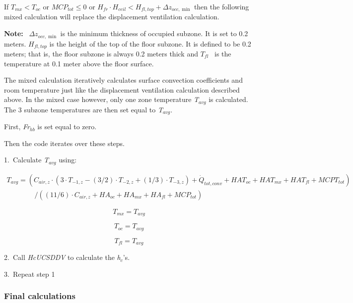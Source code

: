 If \({T_{mx}} < {T_{oc}}\) or \(MC{P_{tot}} \le 0\) or \({H_{fr}} \cdot {H_{ceil}} < {H_{fl,top}} + \Delta {z_{occ,\min }}\) then the following mixed calculation will replace the displacement ventilation calculation.

\textbf{Note:} ~\(\Delta {z_{occ,\min }}\) is the minimum thickness of occupied subzone. It is set to 0.2 meters. \({H_{fl,top}}\) is the height of the top of the floor subzone. It is defined to be 0.2 meters; that is, the floor subzone is always 0.2 meters thick and \({T_{fl}}\) ~is the temperature at 0.1 meter above the floor surface.

The mixed calculation iteratively calculates surface convection coefficients and room temperature just like the displacement ventilation calculation described above. In the mixed case however, only one zone temperature \emph{T\(_{avg}\)} is calculated. The 3 subzone temperatures are then set equal to \emph{T\(_{avg}\)}.

First, \emph{Fr\(_{hb}\)} is set equal to zero.

Then the code iterates over these steps.

1.~Calculate \emph{T\(_{avg}\)} using:

{\scriptsize
\begin{equation}
\begin{array}{l}
T_{avg} = (C_{air,z} \cdot (3 \cdot T_{ - 1,z} - (3/2) \cdot T_{ - 2,z} + (1/3) \cdot T_{ - 3,z}) + \dot Q_{tot,conv} + HAT_{oc} + HAT_{mx} + HAT_{fl} + MCPT_{tot}) \\
\quad \quad \quad \quad / ((11/6) \cdot C_{air,z} + HA_{oc} + HA_{mx} + HA_{fl} + MCP_{tot})
\end{array}
\end{equation}}

\begin{equation}
{T_{mx}} = {T_{avg}}
\end{equation}

\begin{equation}
{T_{oc}} = {T_{avg}}
\end{equation}

\begin{equation}
{T_{fl}} = {T_{avg}}
\end{equation}

2.~Call \emph{HcUCSDDV} to calculate the \emph{h\(_{c}\)}'s.

3.~Repeat step 1

\subsubsection{Final calculations}\label{final-calculations}

